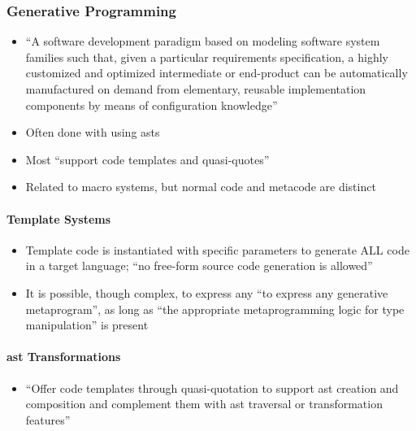 \subsubsection{Generative Programming \citep[p.~113:13-17]{lilis_survey_2019}}
\begin{itemize}
      \item ``A software development paradigm based on modeling software system
            families such that, given a particular requirements specification,
            a highly customized and optimized intermediate or end-product can
            be automatically manufactured on demand from elementary, reusable
            implementation components by means of configuration knowledge''
      \item Often done with using \acsp{ast} \citep[p.~113:31]{lilis_survey_2019}
      \item Most ``support code templates and quasi-quotes''
            \citep[p.~113:31]{lilis_survey_2019}
      \item Related to macro systems, but normal code and metacode are distinct
\end{itemize}

\paragraph{Template Systems \citep[p.~113:13-14]{lilis_survey_2019}}
\begin{itemize}
      \item Template code is instantiated with specific parameters to generate
            ALL code in a target language; ``no free-form source code generation
            is allowed'' \citep[p.~113:13]{lilis_survey_2019}
      \item It is possible, though complex, to express any ``to express any
            generative metaprogram'', as long as ``the appropriate
            metaprogramming logic for type manipulation'' is present
            \citep[p.~113:14]{lilis_survey_2019}
\end{itemize}

\paragraph{\acs{ast} Transformations \citep[p.~113:14-15]{lilis_survey_2019}}
\begin{itemize}
      \item ``Offer code templates through quasi-quotation to support \acs{ast}
            creation and composition and complement them with \acs{ast}
            traversal or transformation features'' \citep[p.~113:14]{lilis_survey_2019}
\end{itemize}

